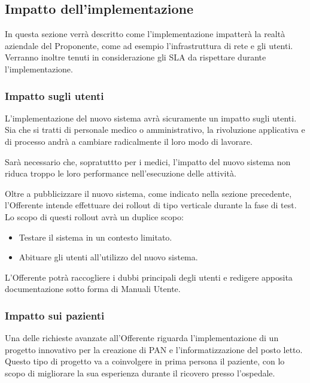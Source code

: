 		\subsection{Impatto dell'implementazione}
        	In questa sezione verrà descritto come l'implementazione impatterà la realtà aziendale del Proponente, come ad esempio l'infrastruttura di rete e gli utenti. Verranno inoltre tenuti in considerazione gli SLA da rispettare durante l'implementazione.
            
            \subsubsection{Impatto sugli utenti}
            	L'implementazione del nuovo sistema avrà sicuramente un impatto sugli utenti. Sia che si tratti di personale medico o amministrativo, la rivoluzione applicativa e di processo andrà a cambiare radicalmente il loro modo di lavorare.
                
                
                Sarà necessario che, sopratuttto per i medici, l'impatto del nuovo sistema non riduca troppo le loro performance nell'esecuzione delle attività.
                
                
                Oltre a pubblicizzare il nuovo sistema, come indicato nella sezione precedente, l'Offerente intende effettuare dei rollout di tipo verticale durante la fase di test. Lo scopo di questi rollout avrà un duplice scopo:
                \begin{itemize}
                	\item Testare il sistema in un contesto limitato.
                    \item Abituare gli utenti all'utilizzo del nuovo sistema.
                \end{itemize}
                L'Offerente potrà raccogliere i dubbi principali degli utenti e redigere apposita documentazione sotto forma di Manuali Utente.
                        
			\subsubsection{Impatto sui pazienti}
            	Una delle richieste avanzate all'Offerente riguarda l'implementazione di un progetto innovativo per la creazione di PAN e l'informatizzazione del posto letto. Questo tipo di progetto va a coinvolgere in prima persona il paziente, con lo scopo di migliorare la sua esperienza durante il ricovero presso l'ospedale.
                
